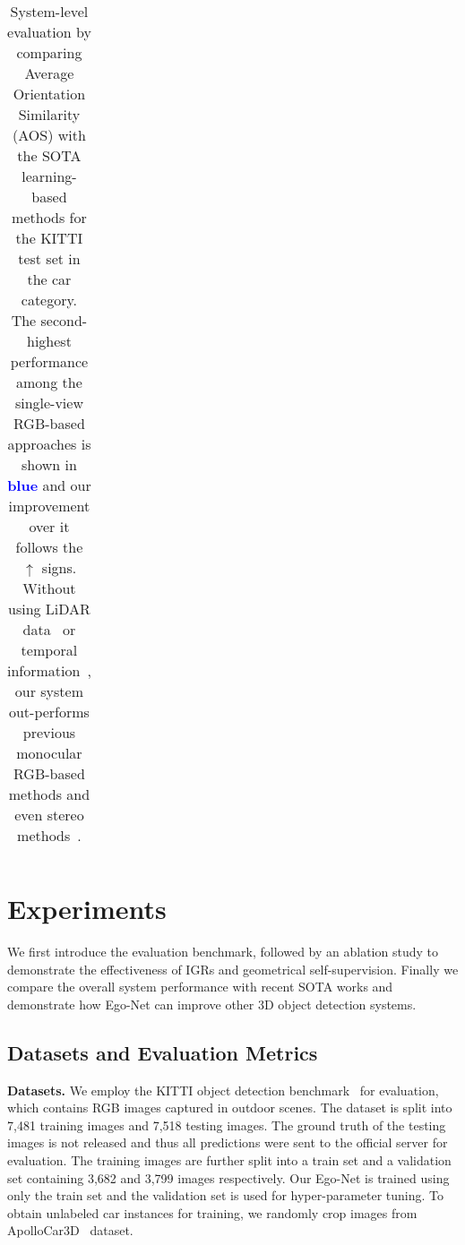 \documentclass[final]{cvpr}
\newcommand{\nd}[1]{\textcolor{blue}{\textbf{#1}}}
\begin{document}
\begin{table*}[ht]
\begin{center}
\begin{tabular}{|c|c|c|c|c|c|c|c|}
			\hline
		\end{tabular}
	\end{center}
	\caption{System-level evaluation by comparing Average Orientation Similarity (AOS) with the SOTA learning-based methods for the KITTI test set in the car category. The second-highest performance among the single-view RGB-based approaches is shown in \nd{blue} and our improvement over it follows the $\uparrow$ signs. Without using LiDAR data~\cite{ku2019monocular} or temporal information~\cite{kinematic-3d}, our system out-performs previous monocular RGB-based methods and even stereo methods~\cite{chen2020dsgn, sun2020disp}.}	
	\label{tab:orientation}
\end{table*}


\section{Experiments}
\label{EX}
We first introduce the evaluation benchmark, followed by an ablation study to demonstrate the effectiveness of IGRs and geometrical self-supervision. Finally we compare the overall system performance with recent SOTA works and demonstrate how Ego-Net can improve other 3D object detection systems.
\subsection{Datasets and Evaluation Metrics}
\noindent\textbf{Datasets.} We employ the KITTI object detection benchmark~\cite{geiger2012we} for evaluation, which contains RGB images captured in outdoor scenes. The dataset is split into 7,481 training images and 7,518 testing images. The ground truth of the testing images is not released and thus all predictions were sent to the official server for evaluation. The training images are further split into a train set and a validation set containing 3,682 and 3,799 images respectively. Our Ego-Net is trained using only the train set and the validation set is used for hyper-parameter tuning. To obtain unlabeled car instances for training, we randomly crop images from ApolloCar3D~\cite{song2019apollocar3d} dataset.
\end{document}
